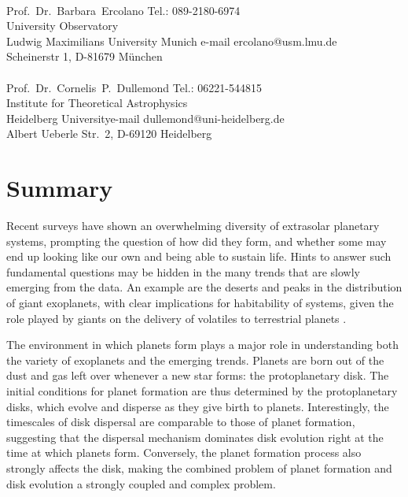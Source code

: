 \documentclass[10pt,fleqn,twoside,a4paper]{article}
\begin{document}
\\
Prof.~Dr.~Barbara~Ercolano \hfill Tel.: 089-2180-6974\\
University Observatory  \\
Ludwig Maximilians University Munich \hfill e-mail ercolano@usm.lmu.de\\
Scheinerstr 1, D-81679 M\"unchen\\

\\
Prof.~Dr.~Cornelis~P.~Dullemond \hfill Tel.: 06221-544815\\
Institute for Theoretical Astrophysics\\
 Heidelberg University\hfill e-mail dullemond@uni-heidelberg.de\\
Albert Ueberle Str.\ 2, D-69120 Heidelberg\\


\pagebreak[4]

\fontsize{11}{12}\selectfont

\section{Summary}

Recent surveys have shown an overwhelming diversity of extrasolar
planetary systems, prompting the question of how did they form,
and whether some may end up
looking like our own and being able to sustain life. Hints to answer
such fundamental questions may be hidden in the many trends that are
slowly emerging from the data. An example are the deserts and peaks in the distribution of
giant exoplanets, with clear implications for habitability of systems,
given the role played by giants on the delivery of volatiles to
terrestrial planets \citep[e.g.,][]{2014ApJ...786...33Q}. 

The environment
in which planets form plays a major role in understanding both the
variety of exoplanets and the emerging trends. Planets are
born out of the dust and gas left over whenever a new star forms: the
protoplanetary disk. The initial conditions for planet formation
are thus determined by the protoplanetary disks, which evolve and disperse as they
give birth to planets. Interestingly, the timescales of disk dispersal
are comparable to those of planet formation, suggesting that the
dispersal mechanism dominates disk evolution right at the time at
which planets form.  Conversely, the planet formation process also
strongly affects the disk, making the combined problem of planet formation
and disk evolution a strongly coupled and complex problem. 
\end{document}
